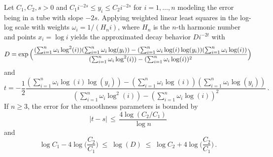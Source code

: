 \documentclass[10pt,a4paper]{amsart}
\begin{document}
\begin{theorem}\label{learrates} Let $C_1,C_2,s>0$ and $C_1i^{-2s}\le y_i \le C_2i^{-2s}$ for $i=1,\dots,n$ modeling the error being in a tube with slope $-2s$.
    Applying weighted linear least squares in the log-log scale with weights $\omega_i = 1/(H_n i)$, where $H_n$ is the $n$-th harmonic number and points $x_i = \log i$ yields the approximated decay behavior $D i^{-2t}$ with
    \begin{equation*}
        D = \exp\Big(\frac{(\sum_{i=1}^{n}\omega_i \log^2(i))(\sum_{i=1}^{n} \omega_i \log(y_i)) - (\sum_{i=1}^{n} \omega_i \log(i) \log(y_i))(\sum_{i=1}^{n}\omega_i \log(i))}{(\sum_{i=1}^{n}\omega_i \log^2(i))-(\sum_{i=1}^{n}\omega_i \log(i))^2}\Big) \\
    \end{equation*}
    and
    \begin{equation*}
        t = -\frac 12 \frac{(\sum_{i=1}^{n}\omega_i \log(i) \log(y_i)) - (\sum_{i=1}^{n} \omega_i \log(i))(\sum_{i=1}^{n} \omega_i \log(y_i))}{(\sum_{i=1}^{n}\omega_i \log^2(i)) - (\sum_{i=1}^{n}\omega_i \log(i))^2} \,.
    \end{equation*}
    If $n\ge 3$, the error for the smoothness parameters is bounded by
    \begin{equation*}
        |t-s| \,\le\, \frac{4\log(C_2/C_1)}{\log n}
    \end{equation*}
    and
    \begin{equation*}
        \log C_1 - 4\log\Big(\frac{C_2}{C_1}\Big)
        \;\le\; \log(D)
        \;\le\; \log C_2 + 4\log\Big(\frac{C_2}{C_1}\Big) \,.
    \end{equation*}
\end{theorem} 
\end{document}
